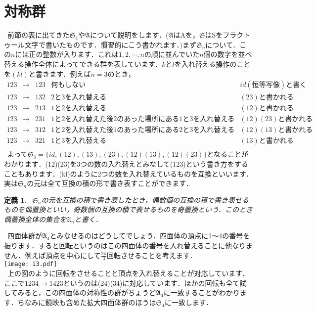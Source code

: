 \documentclass[./main]{subfiles}
\theoremstyle{idefinition}
\newtheorem{idefi}{定義}[section]
\begin{document}
\section{対称群}
\ 前節の表に出てきた$\mathfrak{S}_4$や$\mathfrak{A}$について説明をします．($\mathfrak{A}$はAを，$\mathfrak{S}$はSをフラクトゥール文字で書いたものです．慣習的にこう書かれます．)まず$\mathfrak{S}_n$について．この$n$には正の整数が入ります．これは$1,2,\cdots,n$の順に並んでいた$n$個の数字を並べ替える操作全体によってできる群を表しています．$k$と$l$を入れ替える操作のことを$(kl)$と書きます．例えば$n=3$のとき，
\[
\begin{array}{cccll}
123&\rightarrow&123&何もしない&id(恒等写像)と書く\\
123&\rightarrow&132&2と3を入れ替える&(23)と書かれる\\
123&\rightarrow&213&1と2を入れ替える&(12)と書かれる\\
123&\rightarrow&231&1と2を入れ替えた後2のあった場所にある1と3を入れ替える&(12)(23)と書かれる\\
123&\rightarrow&312&1と2を入れ替えた後1のあった場所にある2と3を入れ替える&(12)(13)と書かれる\\
123&\rightarrow&321&1と3を入れ替える&(13)と書かれる\\
\end{array}
\]
\ よって$\mathfrak{S}_3=\{id,(12),(13),(23),(12)(13),(12)(23)\}$となることがわかります．(12)(23)を3つの数の入れ替えとみなして(123)という書き方をすることもあります．(kl)のように2つの数を入れ替えているものを互換といいます．実は$\mathfrak{S}_n$の元は全て互換の積の形で書き表すことができます．\\

\begin{idefi}
\ $\mathfrak{S}_n$の元を互換の積で書き表したとき，偶数個の互換の積で書き表せるものを偶置換といい，奇数個の互換の積で表せるものを奇置換という．このとき偶置換全体の集合を$\mathfrak{A}_n$と書く．
\end{idefi}

\ 四面体群が$\mathfrak{A}_4$とみなせるのはどうしてでしょう．四面体の頂点に1～4の番号を振ります．すると回転というのはこの四面体の番号を入れ替えることに他なりません．例えば頂点を中心にして$\frac{2\pi}{3}$回転させることを考えます．\\
\texttt{[image: i3.pdf]}\\
\ 上の図のように回転をさせることと頂点を入れ替えることが対応しています．ここで$1234\rightarrow1423$というのは(24)(34)に対応しています．ほかの回転も全て試してみると，この四面体の対称性の群がちょうど$\mathfrak{A}_4$に一致することがわかります．ちなみに鏡映も含めた拡大四面体群のほうは$\mathfrak{S}_4$に一致します．\\
\end{document}

